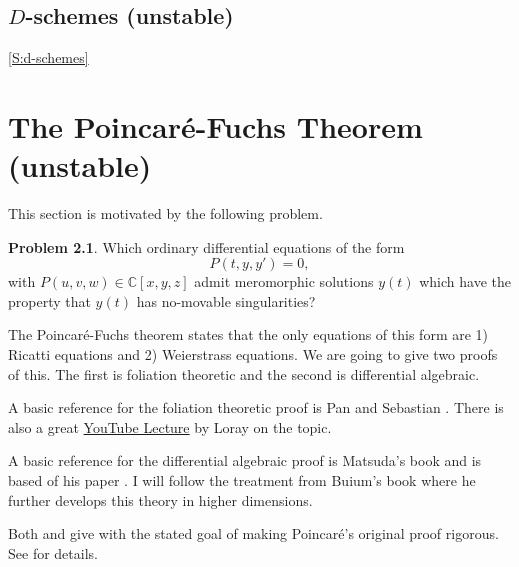 \documentclass[12pt]{book}
\numberwithin{equation}{section}
\theoremstyle{definition}
\newtheorem{problem}[theorem]{Problem}
\theoremstyle{remark}
\newcommand{\CC}{\mathbb{C}}
\begin{document}
\section{$D$-schemes (unstable) }\ref{S:d-schemes}



 
\chapter[Poincar\'{e}-Fuchs]{The Poincar\'{e}-Fuchs Theorem (unstable) }

This section is motivated by the following problem.
\begin{problem}
Which ordinary differential equations of the form
	  $$ P(t,y,y') =0, $$
with $P(u,v,w) \in \CC[x,y,z]$ admit meromorphic solutions $y(t)$ which have the property that $y(t)$ has no-movable singularities? 
\end{problem}
The Poincar\'e-Fuchs theorem states that the only equations of this form are 1) Ricatti equations and 2) Weierstrass equations. 
We are going to give two proofs of this. 
The first is foliation theoretic and the second is differential algebraic. 

A basic reference for the foliation theoretic proof is Pan and Sebastian \cite{Pan2004}.
There is also a great \href{https://www.youtube.com/watch?v=DoCCm8zjvXQ&list=PL0E0n75oNCDk5tuV-t2_K56sEfLd0Od8H&index=21}{YouTube Lecture} by Loray on the topic. 

A basic reference for the differential algebraic proof is Matsuda's book \cite{Matsuda1980} and is based of his paper \cite{Matsuda1978}.
I will follow the treatment from Buium's book \cite{Buium1986} where he further develops this theory in higher dimensions.

Both \cite{Pan2004} and \cite{Matsuda1978} give with the stated goal of making Poincar\'e's original proof rigorous. 
See \cite{Matsuda1978} for details.


\end{document}
